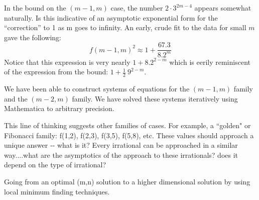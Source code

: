\documentclass[superscriptaddress,reprint,amsmath,amssymb,aps]{revtex4-1}
\newcommand{\half}{\frac{1}{2}}
\begin{document}
In the bound on the $(m-1,m)$ case, the number $2 \cdot 3^{2m-4}$ appears
somewhat naturally.  Is this indicative of an asymptotic exponential form
for the ``correction'' to 1 as m goes to infinity.  An early, crude fit to
the data for small $m$ gave the following:
\begin{equation*}
f(m-1,m)^2 \approx 1 + \frac{67.3}{8.2^m}
\end{equation*}
Notice that this expression is very nearly $1 + 8.2^{2-m}$ which
is eerily reminiscent of the expression from the bound: $1 + \half~9^{2-m}$.

\vspace{0.15in}
We have been able to construct systems of equations for the $(m-1,m)$ family
and the $(m-2,m)$ family.  We have solved these systems iteratively using
Mathematica to arbitrary precision.

\vspace{0.15in}
This line of thinking suggests other families of cases.  For example, a
``golden" or Fibonacci family:  f(1,2), f(2,3), f(3,5), f(5,8), etc.  These values should
approach a unique answer ‐‐ what is it?  Every irrational can be approached
in a similar way....what are the asymptotics of the approach to these
irrationals?  does it depend on the type of irrational?

\vspace{.15in}

Going from an optimal (m,n) solution to a higher dimensional solution by
using local minimum finding techniques.
\end{document}
